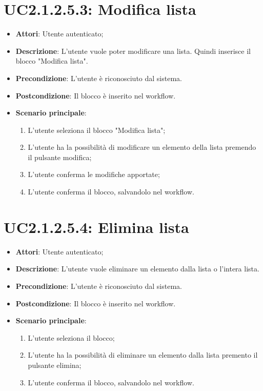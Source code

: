 \section{UC2.1.2.5.3: Modifica lista}
\label{UC2.1.2.5.3}
\begin{itemize}
	\item \textbf{Attori}: Utente autenticato;
	\item \textbf{Descrizione}: L'utente vuole poter modificare una lista. Quindi inserisce il blocco "Modifica lista".
	\item \textbf{Precondizione}: L'utente è riconosciuto dal sistema.
	\item \textbf{Postcondizione}: Il blocco è inserito nel workflow.
	\item \textbf{Scenario principale}:
	\begin{enumerate} \item L'utente seleziona il blocco "Modifica lista"; \item L'utente ha la possibilità di modificare un elemento della lista premendo il pulsante modifica;  \item  L'utente conferma le modifiche apportate; \item L'utente conferma il blocco, salvandolo nel workflow.\end{enumerate}
\end{itemize}

\section{UC2.1.2.5.4: Elimina lista}
\label{UC2.1.2.5.4}
\begin{itemize}
	\item \textbf{Attori}: Utente autenticato;
	\item \textbf{Descrizione}: L'utente vuole eliminare un elemento dalla lista o l'intera lista.
	\item \textbf{Precondizione}: L'utente è riconosciuto dal sistema.
	\item \textbf{Postcondizione}: Il blocco è inserito nel workflow.
	\item \textbf{Scenario principale}:
	\begin{enumerate} \item L'utente seleziona il blocco; \item L'utente ha la possibilità di eliminare un elemento dalla lista premento il pulsante elimina; \item  L'utente conferma il blocco, salvandolo nel workflow.\end{enumerate}
\end{itemize}

